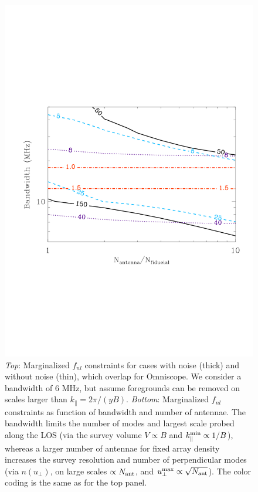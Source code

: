 \documentclass{PoS}
\newcommand{\fnl}{f_{nl}}
\begin{document}
\begin{figure}[!t]
\includegraphics[scale=0.38]{figures/figure5_trim.pdf}
\caption{{\it Top}: Marginalized $\fnl$ constraints for cases with noise (thick) and without noise (thin), which overlap for Omniscope. We consider a bandwidth of 6 MHz, but assume foregrounds can be removed on scales larger than $k_\parallel = 2\pi/(yB)$. 
{\it Bottom}: Marginalized $\fnl$ constraints as function of bandwidth and number of antennae.
The bandwidth limits the number of modes and largest scale probed along the LOS (via the survey volume $V \propto B$ and $k_\parallel^{\rm min} \propto 1/B$), whereas a larger number of antennae for fixed array density increases the survey resolution and number of perpendicular modes (via $n(u_\perp)$, on large scales $\propto N_{\rm ant}$, and $u_\perp^{\rm max} \propto \sqrt{N_{\rm ant}}$).
The color coding is the same as for the top panel.}
\label{fnl}
\end{figure}
\end{document}
